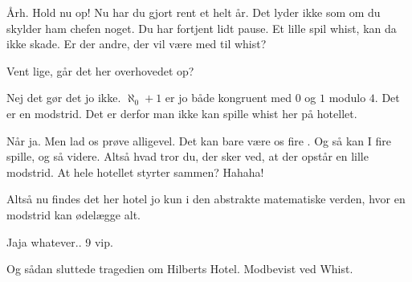 \documentclass[a4paper,11pt]{article}
\begin{document}
\begin{sketch}
 Årh. Hold nu op! Nu har du gjort rent et helt år. Det lyder ikke som om du skylder ham chefen noget. Du har fortjent lidt pause. Et lille spil whist, kan da ikke skade.  Er der andre, der vil være med til whist?


 Vent lige, går det her overhovedet op?

 Nej det gør det jo ikke. $\aleph_0+1$ er jo både kongruent med $0$ og $1$ modulo $4$. Det er en modstrid. Det er derfor man ikke kan spille whist her på hotellet.

 Når ja. Men lad os prøve alligevel. Det kan bare være os fire . Og så kan I fire spille, og så videre. Altså hvad tror du, der sker ved, at der opstår en lille modstrid. At hele hotellet styrter sammen? Hahaha!

 Altså nu findes det her hotel jo kun i den abstrakte matematiske verden, hvor en modstrid kan ødelægge alt.

 Jaja whatever..  9 vip.



 Og sådan sluttede tragedien om Hilberts Hotel. Modbevist ved Whist.
\end{sketch}

\end{document}
